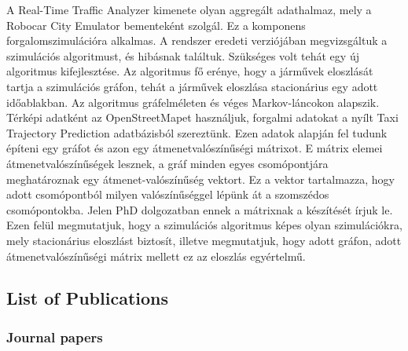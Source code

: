 \documentclass[b5paper,12pt]{report}
\theoremstyle{definition}
\begin{document}
\begin{otherlanguage}{hungarian}
A Real-Time Traffic Analyzer kimenete olyan aggregált adathalmaz, mely a Robocar City Emulator bementeként szolgál. Ez a komponens forgalomszimulációra alkalmas. A rendszer eredeti verziójában megvizsgáltuk a szimulációs algoritmust, és hibásnak találtuk. Szükséges volt tehát egy új algoritmus kifejlesztése. Az algoritmus fő erénye, hogy a járművek eloszlását tartja a szimulációs gráfon, tehát a járművek eloszlása stacionárius egy adott időablakban. Az algoritmus gráfelméleten és véges Markov-láncokon alapszik. Térképi adatként az OpenStreetMapet használjuk, forgalmi adatokat a nyílt Taxi Trajectory Prediction adatbázisból szereztünk. Ezen adatok alapján fel tudunk építeni egy gráfot és azon egy átmenetvalószínűségi mátrixot. E mátrix elemei átmenetvalószínűségek lesznek, a gráf minden egyes csomópontjára meghatároznak egy átmenet-valószínűség vektort. Ez a vektor tartalmazza, hogy adott csomópontból milyen valószínűséggel lépünk át a szomszédos csomópontokba. Jelen PhD dolgozatban ennek a mátrixnak a készítését írjuk le. Ezen felül megmutatjuk, hogy a szimulációs algoritmus képes olyan szimulációkra, mely stacionárius eloszlást biztosít, illetve megmutatjuk, hogy adott gráfon, adott átmenetvalószínűségi mátrix mellett ez az eloszlás egyértelmű.
\end{otherlanguage}

\newpage
\subsection*{List of Publications}

\subsubsection*{Journal papers}
\end{document}
